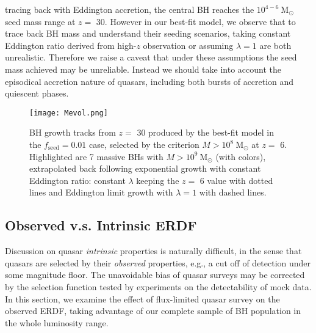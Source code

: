 \documentclass[twocolumn, twocolappendix]{aastex63}
\newcommand{\Msun}{\mathrm{M_\odot}}
\newcommand{\tlife}{t_\mathrm{life}}
\newcommand{\fseed}{f_\mathrm{seed}}
\begin{document}
\begin{CJK*}{UTF8}{gbsn}
tracing back with Eddington accretion, the central BH reaches the $10^{4-6}~\Msun$ seed mass range at $z=$ 30. 
However in our best-fit model, we observe that to trace back BH mass and understand their seeding scenarios, 
taking constant Eddington ratio derived from high-$z$ observation or assuming $\lambda=1$ are both unrealistic. 
Therefore we raise a caveat that under these assumptions the seed mass achieved may be unreliable. 
Instead we should take into account the episodical accretion nature of quasars, 
including both bursts of accretion and quiescent phases.

\begin{figure}
\centering
\texttt{[image: Mevol.png]}
\caption{
BH growth tracks from $z=$ 30 produced by the best-fit model in the $\fseed=0.01$ case, 
selected by the criterion $M>10^8~\Msun$ at $z=$ 6. 
Highlighted are 7 massive BHs with $M>10^9~\Msun$ (with colors), 
extrapolated back following exponential growth with constant Eddington ratio: 
constant $\lambda$ keeping the $z=$ 6 value with dotted lines and 
Eddington limit growth with $\lambda=1$ with dashed lines.
}
\label{fig:track}
\end{figure}

\vspace{2mm}
\subsection{Observed v.s. Intrinsic ERDF}\label{sec:ldist}
Discussion on quasar \textit{intrinsic} properties is naturally difficult, 
in the sense that quasars are selected by their \textit{observed} properties, 
e.g., a cut off of detection under some magnitude floor. 
The unavoidable bias of quasar surveys may be corrected by the selection function tested 
by experiments on the detectability of mock data.
In this section, we examine the effect of flux-limited quasar survey on the observed ERDF, 
taking advantage of our complete sample of BH population in the whole luminosity range. 


\end{CJK*}
\end{document}
